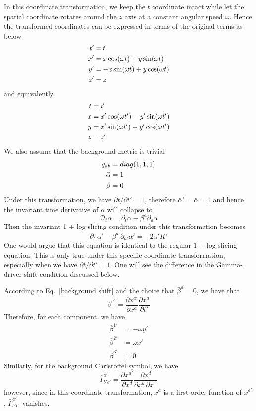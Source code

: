 \documentclass[letterpaper,nofootinbib,prd,amsmath,onecolumn]{revtex4-1}
\begin{document}
In this coordinate transformation, we keep the $t$ coordinate intact while let the spatial coordinate rotates around the $z$ axis at a constant angular speed $\omega$. Hence the transformed coordinates can be expressed in terms of the original terms as below
\begin{align}
t' & = t\notag\\
x' & = x \cos(\omega t) + y\sin(\omega t)\notag\\
y' & = -x\sin(\omega t) + y\cos(\omega t)\notag\\
z' & = z
\end{align}
and equivalently, 
\begin{align}
t & = t'\notag\\
x & = x'\cos(\omega t') - y'\sin(\omega t')\notag\\
y & = x'\sin(\omega t') + y'\cos(\omega t')\notag\\
z & = z'
\end{align}
We also assume that the background metric is trivial
\begin{align}
{\bar g}_{ab} & = diag(1,1,1)\notag\\
{\bar \alpha} & = 1\notag\\
{\bar \beta} & = 0 
\end{align}
Under this transformation, we have $\partial t/\partial t' = 1$, therefore ${\bar \alpha}' = {\bar \alpha} = 1$ and hence the invariant time derivative of $\alpha$ will collapse to
\begin{equation}
\mathscr{D}_{t}\alpha = \partial_{t}\alpha - \beta^{a}\partial_{a}\alpha
\end{equation}
Then the invariant 1 + log slicing condition under this transformation becomes
\begin{equation}\label{transformed 1 + log slicing}
\partial_{t'}\alpha' - \beta^{a'}\partial_{a'}\alpha' = -2\alpha'K'
\end{equation}
One would argue that this equation is identical to the regular 1 + log slicing equation. This is only true under this specific coordinate transformation, especially when we have $\partial t/\partial t' = 1$. One will see the difference in the Gamma-driver shift condition discussed below. 

According to Eq.~\ref{background shift} and the choice that ${\bar \beta}^{a} = 0$, we have that
\[
{\bar \beta}^{a'} = \frac{\partial x^{a'}}{\partial x^{a}}\frac{\partial x^{a}}{\partial t'}
\]
Therefore, for each component, we have
\begin{align*}
{\bar \beta}^{1'} & = -\omega y'\\
{\bar \beta}^{2'} & = \omega x'\\
{\bar \beta}^{3'} & = 0
\end{align*}
Similarly, for the background Christoffel symbol, we have
\[
{\bar \Gamma}^{a'}_{b'c'} = \frac{\partial x^{a'}}{\partial x^{d}}\frac{\partial x^{d}}{\partial x^{b'}\partial x^{c'}}
\]
however, since in this coordinate transformation, $x^{a}$ is a first order function of $x^{a'}$, ${\bar \Gamma}^{a'}_{b'c'}$ vanishes. 
\end{document}
